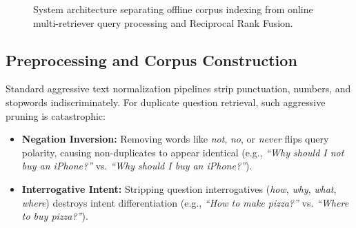 \documentclass[11pt,a4paper]{article}
\begin{document}
\begin{figure}[h]
\caption{System architecture separating offline corpus indexing from online multi-retriever query processing and Reciprocal Rank Fusion.}
\label{fig:architecture}
\end{figure}

\subsection{Preprocessing and Corpus Construction}
Standard aggressive text normalization pipelines strip punctuation, numbers, and stopwords indiscriminately. For duplicate question retrieval, such aggressive pruning is catastrophic:
\begin{itemize}[noitemsep,topsep=0pt]
    \item \textbf{Negation Inversion:} Removing words like \textit{not}, \textit{no}, or \textit{never} flips query polarity, causing non-duplicates to appear identical (e.g., \textit{``Why should I not buy an iPhone?''} vs. \textit{``Why should I buy an iPhone?''}).
    \item \textbf{Interrogative Intent:} Stripping question interrogatives (\textit{how}, \textit{why}, \textit{what}, \textit{where}) destroys intent differentiation (e.g., \textit{``How to make pizza?''} vs. \textit{``Where to buy pizza?''}).
\end{itemize}
\end{document}
